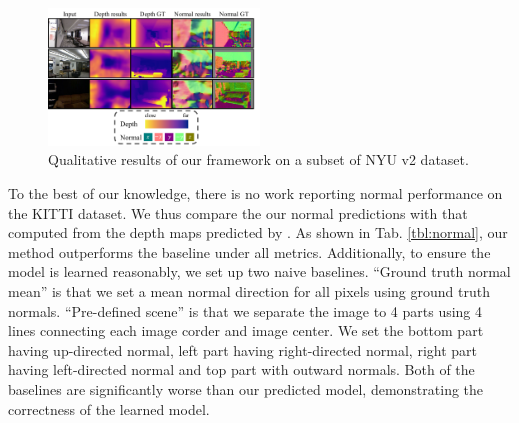 \begin{figure}[h]
\centering
\includegraphics[width=0.5\textwidth]{figures/indoor_visual.pdf}
\caption{Qualitative results of our framework on a subset of NYU v2 dataset.}
\vspace{-1.\baselineskip}
\label{fig:nyu_visual}
\end{figure}

To the best of our knowledge, there is no work reporting normal performance on the KITTI dataset. We thus compare the our normal predictions with that computed from the depth maps predicted by \cite{zhou2017unsupervised}. As shown in Tab. \ref{tbl:normal}, our method outperforms the baseline under all metrics. Additionally, to ensure the model is learned reasonably, we set up two naive baselines. ``Ground truth normal mean'' is that we set a mean normal direction for all pixels using ground truth normals. ``Pre-defined scene'' is that we separate the image to 4 parts using 4 lines connecting each image corder and image center. We set the bottom part having up-directed normal, left part having right-directed normal, right part having left-directed normal and top part with outward normals. Both of the baselines are significantly worse than our predicted model, demonstrating the correctness of the learned model.



